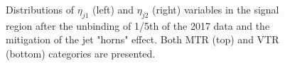 \begin{figure}[htbp]
{    }
  \caption{Distributions of $\eta_{j1}$ (left) and $\eta_{j2}$ (right) variables in the signal region after the unbinding of 1/5th of the 2017 data and the mitigation of the jet "horns" effect. Both MTR (top) and VTR (bottom) categories are presented.}
  \label{fig:jet_eta_postHornCut}
\end{figure}


